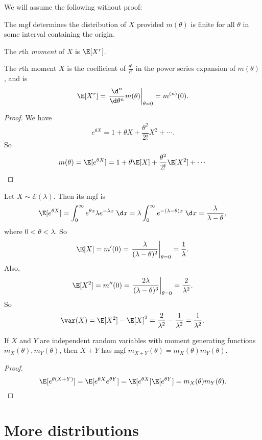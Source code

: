 \documentclass[a4paper]{article}
\begin{document}
We will assume the following without proof:
\begin{thm}
  The mgf determines the distribution of $X$ provided $m(\theta)$ is finite for all $\theta$ in some interval containing the origin.
\end{thm}

\begin{defi}[Moment]
  The $r$th \emph{moment} of $X$ is $\E[X^r]$.
\end{defi}

\begin{thm}
  The $r$th moment $X$ is the coefficient of $\frac{\theta^r}{r!}$ in the power series expansion of $m(\theta)$, and is
  \[
    \E[X^r] = \left.\frac{\d ^n}{\d \theta^n}m(\theta)\right|_{\theta = 0} = m^{(n)}(0).
  \]
\end{thm}

\begin{proof}
  We have
  \[
    e^{\theta X} = 1 + \theta X + \frac{\theta^2}{2!}X^2 + \cdots.
  \]
  So
  \[
    m(\theta) = \E[e^{\theta X}] = 1 + \theta \E[X] + \frac{\theta^2}{2!}\E [X^2] + \cdots\qedhere
  \]
\end{proof}

\begin{eg}
  Let $X\sim \mathcal{E}(\lambda)$. Then its mgf is
  \[
    \E[e^{\theta X}] = \int_0^\infty e^{\theta x}\lambda e^{-\lambda x}\;\d x = \lambda\int_0^\infty e^{-(\lambda - \theta )x}\;\d x = \frac{\lambda}{\lambda - \theta},
  \]
  where $0 < \theta < \lambda$. So
  \[
    \E[X] = m'(0) = \left.\frac{\lambda}{(\lambda - \theta)^2}\right|_{\theta = 0} = \frac{1}{\lambda}.
  \]
  Also,
  \[
    \E[X^2] = m''(0) = \left.\frac{2\lambda}{(\lambda - \theta)^3}\right|_{\theta = 0} = \frac{2}{\lambda^2}.
  \]
  So
  \[
    \var(X) = \E[X^2] - \E[X]^2 = \frac{2}{\lambda^2} - \frac{1}{\lambda^2} = \frac{1}{\lambda^2}.
  \]
\end{eg}

\begin{thm}
  If $X$ and $Y$ are independent random variables with moment generating functions $m_X(\theta), m_Y(\theta)$, then $X + Y$ has mgf $m_{X + Y}(\theta) = m_X(\theta)m_Y(\theta)$.
\end{thm}

\begin{proof}
  \[
    \E[e^{\theta(X + Y)}] = \E[e^{\theta X}e^{\theta Y}] = \E[e^{\theta X}]\E[e^{\theta Y}] = m_X(\theta)m_Y(\theta).\qedhere
  \]
\end{proof}
\section{More distributions}
\end{document}
